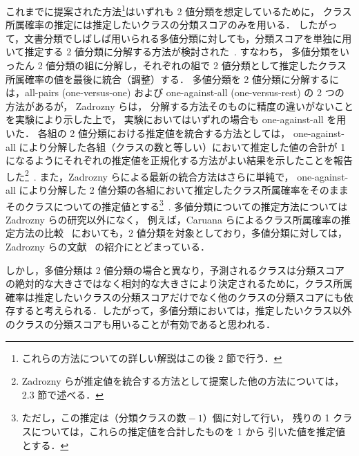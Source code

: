 \documentclass[japanese]{jnlp_1.4}
\begin{document}
これまでに提案された方法\footnote{
	これらの方法についての詳しい解説はこの後 2 節で行う．
}はいずれも 2 値分類を想定しているために，
クラス所属確率の推定には推定したいクラスの分類スコアのみを用いる．
したがって，文書分類でしばしば用いられる多値分類に対しても，分類スコアを単独に用いて推定する 2 値分類に分解する方法が検討された~\cite{Zadrozny02,Zadrozny05}.  
すなわち，
多値分類をいったん 2 値分類の組に分解し，それぞれの組で 2 値分類として推定したクラス所属確率の値を最後に統合（調整）する．
多値分類を 2 値分類に分解するには，all-pairs (one-versus-one) および one-against-all (one-versus-rest) の 2 つの方法があるが，
Zadrozny らは，
分解する方法そのものに精度の違いがないことを実験により示した上で，
実験においてはいずれの場合も one-against-all を用いた．
各組の 2 値分類における推定値を統合する方法としては，
one-against-all により分解した各組（クラスの数と等しい）において推定した値の合計が 1 になるようにそれぞれの推定値を正規化する方法がよい結果を示したことを報告した\footnote{
	Zadrozny らが推定値を統合する方法として提案した他の方法については，
	2.3 節で述べる．
}~\cite{Zadrozny02}. 
また，Zadrozny らによる最新の統合方法はさらに単純で，
one-against-all により分解した 2 値分類の各組において推定したクラス所属確率をそのままそのクラスについての推定値とする\footnote{
	ただし，この推定は（$\text{分類クラスの数}-{1}$）個に対して行い，
	残りの 1 クラスについては，これらの推定値を合計したものを 1 から
	引いた値を推定値とする．
}~\cite{Zadrozny05}. 
多値分類についての推定方法については Zadrozny らの研究以外になく，
例えば，Caruana らによるクラス所属確率の推定方法の比較~\cite{Mizil05} においても，2 値分類を対象としており，多値分類に対しては，Zadrozny らの文献~\cite{Zadrozny02} の紹介にとどまっている．

しかし，多値分類は 2 値分類の場合と異なり，予測されるクラスは分類スコアの絶対的な大きさではなく相対的な大きさにより決定されるために，クラス所属確率は推定したいクラスの分類スコアだけでなく他のクラスの分類スコアにも依存すると考えられる．したがって，多値分類においては，推定したいクラス以外のクラスの分類スコアも用いることが有効であると思われる．
\end{document}
